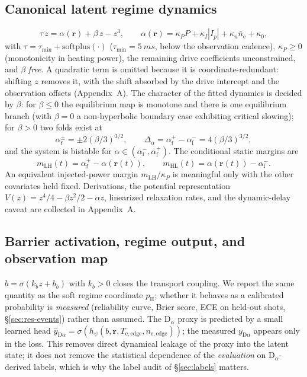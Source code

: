 \documentclass[11pt]{article}
\newcommand{\nel}{n_{\mathrm{e}}}
\newcommand{\lat}{z}
\newcommand{\dr}{\alpha}
\newcommand{\inr}{\bm{r}}
\newcommand{\yD}{y_{\mathrm{D}\alpha}}
\newcommand{\pH}{p_{\mathrm{H}}}
\newcommand{\bact}{b}
\newcommand{\mLH}{m_{\mathrm{LH}}}
\newcommand{\mHL}{m_{\mathrm{HL}}}
\begin{document}
\subsection{Canonical latent regime dynamics}
\label{sec:model-latent}

\begin{equation}
\tau\,\dot\lat = \dr(\inr) + \beta\,\lat - \lat^{3},
\qquad
\dr(\inr) = \kappa_P P + \kappa_I |I_p| + \kappa_n \bar\nel + \kappa_0,
\label{eq:nf}
\end{equation}
with $\tau = \tau_{\min} + \mathrm{softplus}(\cdot)$
($\tau_{\min} = \SI{5}{ms}$, below the observation cadence),
$\kappa_P \geq 0$ (monotonicity in heating power), the remaining drive
coefficients unconstrained, and $\beta$ \emph{free}. A quadratic term is
omitted because it is coordinate-redundant: shifting $\lat$ removes it,
with the shift absorbed by the drive intercept and the observation
offsets (Appendix~A). The character of the fitted dynamics is decided by
$\beta$: for $\beta \leq 0$ the equilibrium map is monotone and there is
one equilibrium branch (with $\beta = 0$ a non-hyperbolic boundary case
exhibiting critical slowing); for $\beta > 0$ two folds exist at
\begin{equation}
\dr_{\mathrm{f}}^{\pm} = \pm 2 (\beta/3)^{3/2},
\qquad
\Delta_\dr = \dr_{\mathrm{f}}^{+} - \dr_{\mathrm{f}}^{-} = 4 (\beta/3)^{3/2},
\label{eq:folds}
\end{equation}
and the system is bistable for
$\dr \in (\dr_{\mathrm{f}}^{-}, \dr_{\mathrm{f}}^{+})$. The conditional
static margins are
\begin{equation}
\mLH(t) = \dr_{\mathrm{f}}^{+} - \dr(\inr(t)),
\qquad
\mHL(t) = \dr(\inr(t)) - \dr_{\mathrm{f}}^{-}.
\label{eq:margins}
\end{equation} An equivalent
injected-power margin $\mLH / \kappa_P$ is meaningful only with the other
covariates held fixed. Derivations, the potential representation
$V(\lat) = \lat^4/4 - \beta\lat^2/2 - \dr\lat$, linearized relaxation
rates, and the dynamic-delay caveat are collected in Appendix~A.

\subsection{Barrier activation, regime output, and observation map}
\label{sec:model-obs}

$\bact = \sigma(k_b \lat + b_b)$ with $k_b > 0$ closes the transport
coupling. We report the same quantity as the soft regime coordinate
$\pH$; whether it behaves as a calibrated probability is \emph{measured}
(reliability curve, Brier score, ECE on held-out shots,
\S\ref{sec:res-events}) rather than assumed. The D$_\alpha$ proxy is
predicted by a small learned head
$\hat\yD = \sigma(h_\psi(\bact, \inr, T_{\mathrm{e,edge}},
n_{\mathrm{e,edge}}))$; the measured $\yD$ appears only in the loss.
This removes direct dynamical leakage of the proxy into the latent state;
it does not remove the statistical dependence of the \emph{evaluation}
on D$_\alpha$-derived labels, which is why the label audit of
\S\ref{sec:labels} matters.
\end{document}

